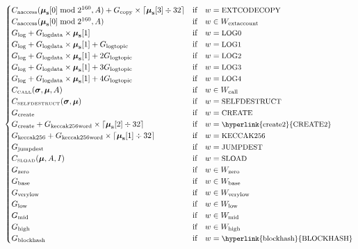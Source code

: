\documentclass[9pt,oneside]{amsart}
\begin{document}
\begin{equation}
\begin{cases}
C_{\mathrm{aaccess}}(\boldsymbol{\mu}_{\mathbf{s}}[0] \bmod 2^{160}, A) + G_{\mathrm{copy}}\times\lceil\boldsymbol{\mu}_{\mathbf{s}}[3] \div 32\rceil & \text{if} \quad w = \text{\small EXTCODECOPY} \\
C_{\mathrm{aaccess}}(\boldsymbol{\mu}_{\mathbf{s}}[0] \bmod 2^{160}, A) & \text{if} \quad w \in W_{\mathrm{extaccount}}\\
G_{\mathrm{log}}+G_{\mathrm{logdata}}\times\boldsymbol{\mu}_{\mathbf{s}}[1] & \text{if} \quad w = \text{\small LOG0} \\
G_{\mathrm{log}}+G_{\mathrm{logdata}}\times\boldsymbol{\mu}_{\mathbf{s}}[1]+G_{\mathrm{logtopic}} & \text{if} \quad w = \text{\small LOG1} \\
G_{\mathrm{log}}+G_{\mathrm{logdata}}\times\boldsymbol{\mu}_{\mathbf{s}}[1]+2G_{\mathrm{logtopic}} & \text{if} \quad w = \text{\small LOG2} \\
G_{\mathrm{log}}+G_{\mathrm{logdata}}\times\boldsymbol{\mu}_{\mathbf{s}}[1]+3G_{\mathrm{logtopic}} & \text{if} \quad w = \text{\small LOG3} \\
G_{\mathrm{log}}+G_{\mathrm{logdata}}\times\boldsymbol{\mu}_{\mathbf{s}}[1]+4G_{\mathrm{logtopic}} & \text{if} \quad w = \text{\small LOG4} \\
C_\text{\tiny CALL}(\boldsymbol{\sigma}, \boldsymbol{\mu}, A) & \text{if} \quad w \in W_{\mathrm{call}} \\
C_\text{\tiny SELFDESTRUCT}(\boldsymbol{\sigma}, \boldsymbol{\mu}) & \text{if} \quad w = \text{\small SELFDESTRUCT} \\
G_{\mathrm{create}} & \text{if} \quad w = \text{\small CREATE}\\
G_{\mathrm{create}}+G_{\mathrm{keccak256word}} \times \lceil \boldsymbol{\mu}_{\mathbf{s}}[2] \div 32 \rceil & \text{if} \quad w = \text{\small \hyperlink{create2}{CREATE2}}\\
G_{\mathrm{keccak256}}+G_{\mathrm{keccak256word}} \times \lceil \boldsymbol{\mu}_{\mathbf{s}}[1] \div 32 \rceil & \text{if} \quad w = \text{\small KECCAK256}\\
G_{\mathrm{jumpdest}} & \text{if} \quad w = \text{\small JUMPDEST}\\
C_\text{\tiny SLOAD}(\boldsymbol{\mu}, A, I) & \text{if} \quad w = \text{\small SLOAD}\\
G_{\mathrm{zero}} & \text{if} \quad w \in W_{\mathrm{zero}}\\
G_{\mathrm{base}} & \text{if} \quad w \in W_{\mathrm{base}}\\
G_{\mathrm{verylow}} & \text{if} \quad w \in W_{\mathrm{verylow}}\\
G_{\mathrm{low}} & \text{if} \quad w \in W_{\mathrm{low}}\\
G_{\mathrm{mid}} & \text{if} \quad w \in W_{\mathrm{mid}}\\
G_{\mathrm{high}} & \text{if} \quad w \in W_{\mathrm{high}}\\
G_{\mathrm{blockhash}} & \text{if} \quad w = \text{\small \hyperlink{blockhash}{BLOCKHASH}}\\
\end{cases}
\end{equation}
\end{document}
